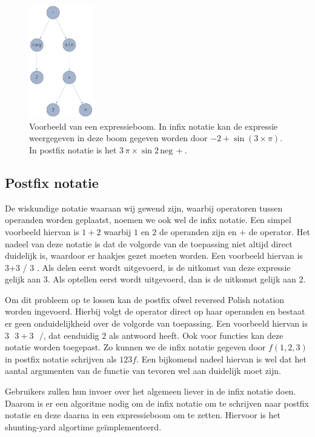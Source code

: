 \documentclass[a4paper]{article}
\begin{document}
\begin{figure}[!htb]
	\centering
	\includegraphics[width=0.25\textwidth]{expressionTree}
	\caption{Voorbeeld van een expressieboom. In infix notatie  kan de expressie weergegeven in deze boom gegeven worden door $-2+\sin(3\times \pi)$. In postfix notatie is het $3\,\pi\times\sin 2\, \mathrm{neg}\,+$.}\label{fig:boom}
\end{figure}

\subsection{Postfix notatie}
De wiskundige notatie waaraan wij gewend zijn, waarbij operatoren tussen operanden worden geplaatst, noemen we ook wel de infix notatie. Een simpel voorbeeld hiervan is $1 + 2$  waarbij $1$ en $2$ de operanden zijn en $+$ de operator. Het nadeel van deze notatie is dat de volgorde van de toepassing niet altijd direct duidelijk is, waardoor er haakjes gezet moeten worden. Een voorbeeld hiervan is 3+3 / 3 . Als delen eerst wordt uitgevoerd, is de uitkomst van deze expressie gelijk aan $3$. Als optellen eerst wordt uitgevoerd, dan is de uitkomst gelijk aan $2$. 

Om dit probleem op te lossen kan de postfix ofwel reversed Polish notation worden ingevoerd. Hierbij volgt de operator direct op haar operanden en bestaat er geen onduidelijkheid over de volgorde van toepassing. Een voorbeeld hiervan is $3\text{ } 3 + 3 \text{ } /$, dat eenduidig $2$ als antwoord heeft. Ook voor functies kan deze notatie worden toegepast. Zo kunnen we de infix notatie gegeven door $f(1,2,3)$ in postfix notatie schrijven als $123f$. Een bijkomend nadeel hiervan is wel dat het aantal argumenten van de functie van tevoren wel aan duidelijk moet zijn.

Gebruikers zullen hun invoer over het algemeen liever in de infix notatie doen. Daarom is er een algoritme nodig om de infix notatie om te schrijven naar postfix notatie en deze daarna in een expressieboom om te zetten. Hiervoor is het shunting-yard algortime ge\"implementeerd.
\end{document}
